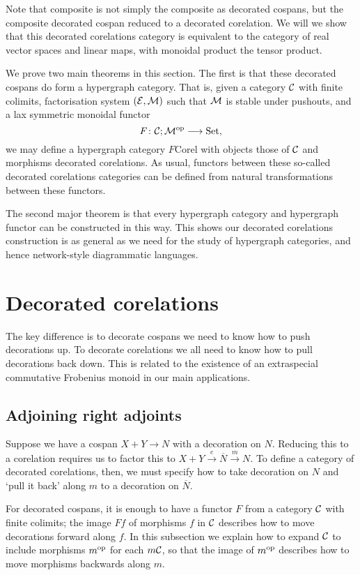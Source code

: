Note that composite is not simply the composite as decorated cospans, but the
composite decorated cospan reduced to a decorated corelation. We will we show
that this decorated corelations category is equivalent to the category of real
vector spaces and linear maps, with monoidal product the tensor product.

We prove two main theorems in this section. The first is that these decorated
cospans do form a hypergraph category. That is, given a category $\mathcal C$ with
finite colimits, factorisation system $(\mathcal E,\mathcal M)$ such that $\mathcal M$ is
stable under pushouts, and a lax symmetric monoidal functor 
\[
  F{\colon} \mathcal C; \mathcal M^{\mathrm{op}} \longrightarrow \mathrm{Set},
\]
we may define a hypergraph category $F\mathrm{Corel}$ with objects those of $\mathcal
C$ and morphisms decorated corelations. As usual, functors between these
so-called decorated corelations categories can be defined from natural
transformations between these functors.

The second major theorem is that every hypergraph category and hypergraph
functor can be constructed in this way. This shows our decorated corelations
construction is as general as we need for the study of hypergraph categories,
and hence network-style diagrammatic languages.


\section{Decorated corelations} \label{sec:dcorc}

The key difference is to decorate cospans we need to know how to push
decorations up. To decorate corelations we all need to know how to pull
decorations back down. This is related to the existence of an extraspecial
commutative Frobenius monoid in our main applications.



\subsection{Adjoining right adjoints}

Suppose we have a cospan $X+Y \to N$ with a decoration on $N$. Reducing this to
a corelation requires us to factor this to $X+Y \stackrel{e}\to \overline{N}
\stackrel{m}\to N$. To define a category of decorated corelations, then, we must
specify how to take decoration on $N$ and `pull it back' along $m$ to a decoration on
$\overline{N}$.

For decorated cospans, it is enough to have a functor $F$ from a category $\mathcal C$
with finite colimits; the image $Ff$ of morphisms $f$ in $\mathcal C$ describes how
to move decorations forward along $f$. In this subsection we explain how to
expand $\mathcal C$ to include morphisms $m^{\mathrm{op}}$ for each $m \mathcal C$, so that the
image of $m^{\mathrm{op}}$ describes how to move morphisms backwards along $m$.

